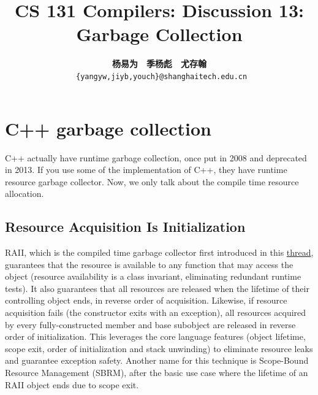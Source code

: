 \documentclass[a4paper]{article}
\title{CS 131 Compilers: Discussion 13: Garbage Collection}
\author{\textbf{杨易为}~~\textbf{季杨彪}~~\textbf{尤存翰} \\ \texttt{ \{yangyw,jiyb,youch\}@shanghaitech.edu.cn}}
\theoremstyle{definition}
\begin{document}
\maketitle
\section{C++ garbage collection}
C++ actually have runtime garbage collection, once put in 2008 and deprecated in 2013. If you use some of the implementation of C++, they have runtime resource garbage collector. Now, we only talk about the compile time resource allocation.
\subsection{Resource Acquisition Is Initialization}
RAII, which is the compiled time garbage collector first introduced in this \href{http://www.open-std.org/jtc1/sc22/wg21/docs/papers/2008/n2670.htm}{thread}, guarantees that the resource is available to any function that may access the object (resource availability is a class invariant, eliminating redundant runtime tests). It also guarantees that all resources are released when the lifetime of their controlling object ends, in reverse order of acquisition. Likewise, if resource acquisition fails (the constructor exits with an exception), all resources acquired by every fully-constructed member and base subobject are released in reverse order of initialization. This leverages the core language features (object lifetime, scope exit, order of initialization and stack unwinding) to eliminate resource leaks and guarantee exception safety. Another name for this technique is Scope-Bound Resource Management (SBRM), after the basic use case where the lifetime of an RAII object ends due to scope exit.
\end{document}
